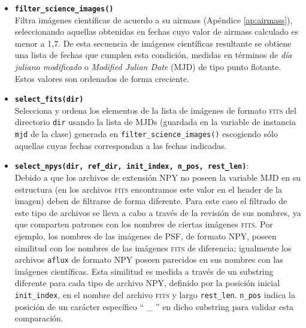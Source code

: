 \begin{appendix}
\begin{itemize}
\item \textbf{\texttt{filter\_science\_images()}}\\
Filtra im\'agenes cient\'ificas de acuerdo a su airmass (Ap\'endice  \ref{ap:airmass}), seleccionando aquellas obtenidas en fechas cuyo valor de airmass calculado es menor a 1,7. De esta secuencia de im\'agenes cient\'ificas resultante se obtiene una lista de fechas que cumplen esta condici\'on, medidas en t\'erminos de \textit{d\'ia juliano modificado} o \textit{Modified Julian Date} (MJD) de tipo punto flotante. Estos valores son ordenados de forma creciente.%
\bigskip

\item \textbf{\texttt{select\_fits(dir)}}\\
Selecciona y ordena los elementos de la lista de im\'agenes de formato \textsc{fits} del directorio \texttt{dir} usando la lista de MJDs (guardada en la variable de instancia \texttt{mjd} de la clase) generada en \texttt{filter\_science\_images()} escogiendo s\'olo aquellas cuyas fechas correspondan a las fechas indicadas.  %
\bigskip

\item \textbf{\texttt{select\_npys(dir, ref\_dir, init\_index, n\_pos, rest\_len)}}:\\
Debido a que los archivos de extensi\'on NPY no poseen la variable MJD en su estructura (en los archivos \textsc{fits} encontramos este valor en el header de la imagen) deben de filtrarse de forma diferente. Para este caso el filtrado de este tipo de archivos se lleva a cabo a trav\'es de la revisi\'on de sus nombres, ya que comparten patrones con los nombres de ciertas im\'agenes \textsc{fits}. Por ejemplo, los nombres de las im\'agenes de PSF, de formato NPY, poseen similitud con los nombres de las im\'agenes \textsc{fits} de diferencia; igualmente los archivos \texttt{aflux} de formato NPY poseen parecidos en sus nombres con las im\'agenes cient\'ificas. Esta similitud es medida a trav\'es de un substring diferente para cada tipo de archivo NPY, definido por la posici\'on inicial \texttt{init\_index}, en el nombre del archivo \textsc{fits} y largo \texttt{rest\_len}. \texttt{n\_pos} indica la posici\'on de un car\'acter espec\'ifico `` \_ '' en dicho substring para validar esta comparaci\'on.


\end{itemize}
\end{appendix}
